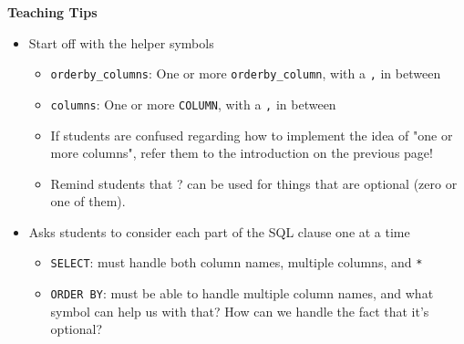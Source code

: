 \begin{guide}
\begin{blocksection}
\textbf{Teaching Tips}
\begin{itemize}
  \item Start off with the helper symbols
  \begin{itemize}
    \item \lstinline{orderby_columns}: One or more \lstinline{orderby_column}, with a \lstinline{,} in between
    \item \lstinline{columns}: One or more \lstinline{COLUMN}, with a \lstinline{,} in between
    \item If students are confused regarding how to implement the idea of "one or more columns", refer them to the introduction on the previous page!
    \item Remind students that ? can be used for things that are optional (zero or one of them).
  \end{itemize}
  \item Asks students to consider each part of the SQL clause one at a time
  \begin{itemize}
    \item \lstinline{SELECT}: must handle both column names, multiple columns, and \lstinline{*}
    \item \lstinline{ORDER BY}: must be able to handle multiple column names, and what symbol can help us with that? How can we handle the fact that it's optional?
  \end{itemize}
\end{itemize}
\end{blocksection}
\end{guide}
